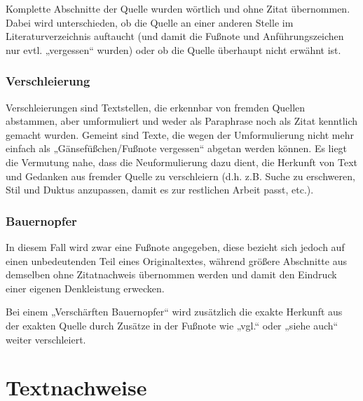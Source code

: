 \documentclass[ngerman,final,fontsize=12pt,paper=a4,twoside,bibliography=totoc,BCOR=8mm,draft=false]{scrartcl}
\begin{document}
Komplette Abschnitte der Quelle wurden wörtlich und ohne Zitat übernommen. Dabei wird unterschieden, ob die Quelle an einer anderen Stelle im Literaturverzeichnis auftaucht (und damit die Fußnote und Anführungszeichen nur evtl. „vergessen“ wurden) oder ob die Quelle überhaupt nicht erwähnt ist. 

\subsubsection{%
 Verschleierung }

Verschleierungen sind Textstellen, die erkennbar von fremden Quellen abstammen, aber umformuliert und weder als Paraphrase noch als Zitat kenntlich gemacht wurden. Gemeint sind Texte, die wegen der Umformulierung nicht mehr einfach als „Gänsefüßchen/Fußnote vergessen“ abgetan werden können. Es liegt die Vermutung nahe, dass die Neuformulierung dazu dient, die Herkunft von Text und Gedanken aus fremder Quelle zu verschleiern (d.h. z.B. Suche zu erschweren, Stil und Duktus anzupassen, damit es zur restlichen Arbeit passt, etc.). 

\subsubsection{%
 Bauernopfer }

In diesem Fall wird zwar eine Fußnote angegeben, diese bezieht sich jedoch auf einen unbedeutenden Teil eines Originaltextes, während größere Abschnitte aus demselben ohne Zitatnachweis übernommen werden und damit den Eindruck einer eigenen Denkleistung erwecken. 


Bei einem „Verschärften Bauernopfer“ wird zusätzlich die exakte Herkunft aus der exakten Quelle durch Zusätze in der Fußnote wie „vgl.“ oder „siehe auch“ weiter verschleiert. 




\appendix
\section{Textnachweise}



\renewcommand{\bibname}{Quellenverzeichnis}


\end{document}
